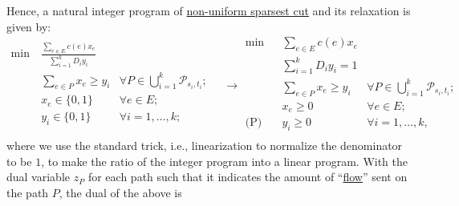Hence, a natural integer program of \hyperref[prb:non-uniform-sparsest-cut]{non-uniform sparsest cut} and its relaxation is given by:
\begin{equation}\label{eq:non-uniform-sparsest-cut-LP-primal}
	\begin{aligned}
		\min~ & \frac{\sum_{e \in E} c(e) x_e}{\sum_{i=1}^{k} D_i y_i}                                                            \\
		      & \sum_{e \in P} x_e \geq y_i                            & \forall P \in \bigcup_{i=1}^{k} \mathcal{P} _{s_i, t_i}; \\
		      & x_e \in \{ 0, 1 \}                                     & \forall e \in E;                                         \\
		      & y_i \in \{ 0, 1 \}                                     & \forall i = 1, \dots , k;                                \\
	\end{aligned}\quad
	\to
	\begin{aligned}
		\min~           & \sum_{e \in E} c(e) x_e                                                                \\
		                & \sum_{i=1}^{k} D_i y_i = 1                                                             \\
		                & \sum_{e \in P} x_e \geq y_i & \forall P \in \bigcup_{i=1}^{k} \mathcal{P} _{s_i, t_i}; \\
		                & x_e \geq 0                  & \forall e \in E ;                                        \\
		\text{(P)}\quad & y_i \geq 0                  & \forall i = 1, \dots , k,                                \\
	\end{aligned}
\end{equation}
where we use the standard trick, i.e., linearization to normalize the denominator to be \(1\), to make the ratio of the integer program into a linear program. With the dual variable \(z_P\) for each path such that it indicates the amount of ``\hyperref[def:flow]{flow}'' sent on the path \(P\), the dual of the above is
